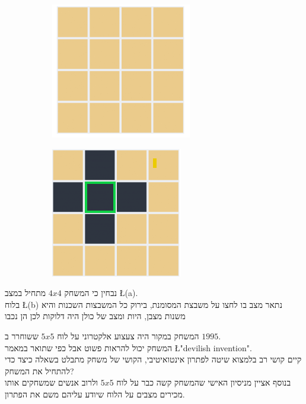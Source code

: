 \documentclass[12pt,twoside]{article}
\begin{document}
\begin{figure}[h]
    \begin{subfigure}{.5\textwidth}
        \unsethebrew
        \caption{}
        \centering
        \includegraphics{images/4x4_start_board.PNG}
        \sethebrew
    \end{subfigure}%
    \begin{subfigure}{.5\textwidth}
        \unsethebrew
        \caption{}
        \centering
        \includegraphics{images/4x4_press.PNG}
        \sethebrew
    \end{subfigure}%
\end{figure}

נבחין כי המשחק 
$4x4$
מתחיל במצב
\L{(a)}.
\\
בלוח 
\L{(b)}
נתאר מצב בו לחצו על משבצת המסומנת, בירוק
כל המשבצות השכנות והיא משנות מצבן, היות ומצב של כולן היה דלוקות לכן הן נכבו

המשחק במקור היה צעצוע אלקטרוני על לוח 
$5x5$
ששוחרר ב 
$1995$.
\\
המשחק יכול להראות פשוט אבל כפי שתואר
במאמר
\cite{B1}
\L{"devilish invention"}.
\\
קיים קושי רב בלמצוא שיטה לפתרון אינטואיטיבי, הקושי של משחק מתבלט בשאלה כיצד כדי להתחיל את המשחק?
\\
בנוסף אציין מניסיון האישי שהמשחק קשה כבר 
על לוח 
$5x5$
ולרוב אנשים שמשחקים אותו מכירים מצבים על הלוח שיודע עליהם משם את הפתרון.
\end{document}
